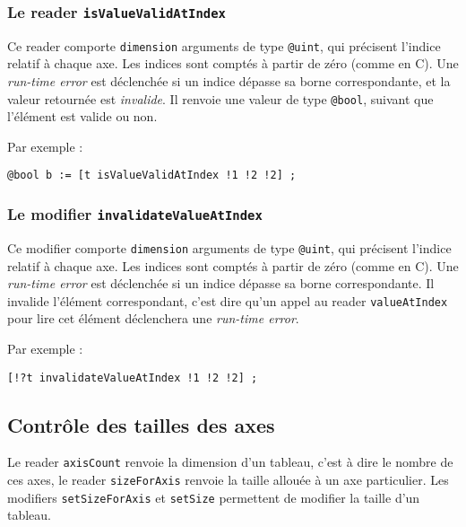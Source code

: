 \subsubsection{Le reader \lstinline[language=galgas]!isValueValidAtIndex!}

Ce reader comporte \lstinline[language=galgas]!dimension! arguments de type \lstinline[language=galgas]!@uint!, qui précisent l'indice relatif à chaque axe. Les indices sont comptés à partir de zéro (comme en C). Une \emph{run-time error} est déclenchée si un indice dépasse sa borne correspondante, et la valeur retournée est \emph{invalide}. Il renvoie une valeur de type \lstinline[language=galgas]!@bool!, suivant que l'élément est valide ou non.

Par exemple :
\begin{lstlisting}[language=galgas]
  @bool b := [t isValueValidAtIndex !1 !2 !2] ;
\end{lstlisting}


\subsubsection{Le modifier \lstinline[language=galgas]!invalidateValueAtIndex!}

Ce modifier comporte \lstinline[language=galgas]!dimension! arguments de type \lstinline[language=galgas]!@uint!, qui précisent l'indice relatif à chaque axe. Les indices sont comptés à partir de zéro (comme en C). Une \emph{run-time error} est déclenchée si un indice dépasse sa borne correspondante. Il invalide l'élément correspondant, c'est dire qu'un appel au reader \lstinline[language=galgas]!valueAtIndex! pour lire cet élément déclenchera une \emph{run-time error}.

Par exemple :
\begin{lstlisting}[language=galgas]
  [!?t invalidateValueAtIndex !1 !2 !2] ;
\end{lstlisting}





\subsection{Contrôle des tailles des axes}

Le reader \lstinline[language=galgas]!axisCount! renvoie la dimension d'un tableau, c'est à dire le nombre de ces axes, le reader \lstinline[language=galgas]!sizeForAxis! renvoie la taille allouée à un axe particulier. Les modifiers \lstinline[language=galgas]!setSizeForAxis! et \lstinline[language=galgas]!setSize! permettent de modifier la taille d'un tableau.



